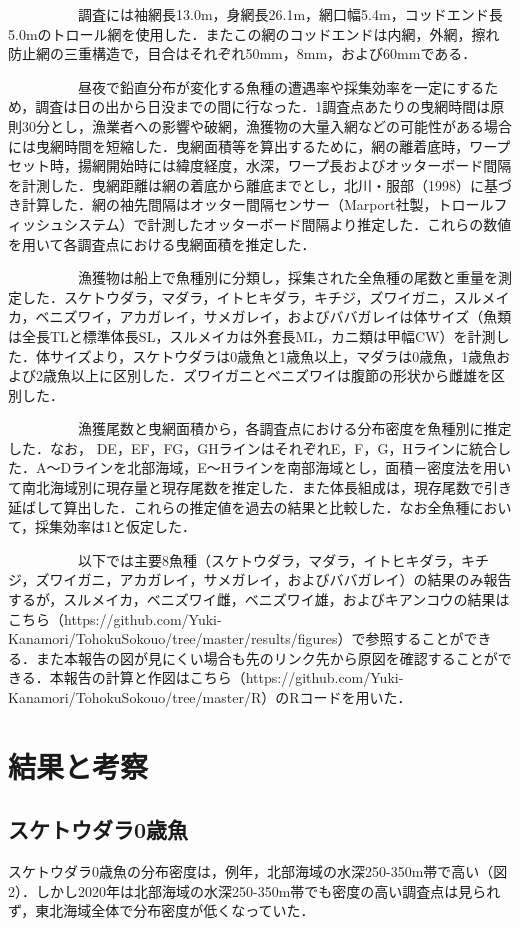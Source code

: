 \documentclass[11pt]{article} %
\begin{document}
\begin{linenumbers}
\ \ \ \ \ \ \ \ \ \ 
調査には袖網長13.0m，身網長26.1m，網口幅5.4m，コッドエンド長5.0mのトロール網を使用した．またこの網のコッドエンドは内網，外網，擦れ防止網の三重構造で，目合はそれぞれ50mm，8mm，および60mmである．

\ \ \ \ \ \ \ \ \ \ 
昼夜で鉛直分布が変化する魚種の遭遇率や採集効率を一定にするため，調査は日の出から日没までの間に行なった．1調査点あたりの曳網時間は原則30分とし，漁業者への影響や破網，漁獲物の大量入網などの可能性がある場合には曳網時間を短縮した．曳網面積等を算出するために，網の離着底時，ワープセット時，揚網開始時には緯度経度，水深，ワープ長およびオッターボード間隔を計測した．曳網距離は網の着底から離底までとし，北川・服部（1998）に基づき計算した．網の袖先間隔はオッター間隔センサー（Marport社製，トロールフィッシュシステム）で計測したオッターボード間隔より推定した．これらの数値を用いて各調査点における曳網面積を推定した．

\ \ \ \ \ \ \ \ \ \ 
漁獲物は船上で魚種別に分類し，採集された全魚種の尾数と重量を測定した．スケトウダラ，マダラ，イトヒキダラ，キチジ，ズワイガニ，スルメイカ，ベニズワイ，アカガレイ，サメガレイ，およびババガレイは体サイズ（魚類は全長TLと標準体長SL，スルメイカは外套長ML，カニ類は甲幅CW）を計測した．体サイズより，スケトウダラは0歳魚と1歳魚以上，マダラは0歳魚，1歳魚および2歳魚以上に区別した．ズワイガニとベニズワイは腹節の形状から雌雄を区別した．

\ \ \ \ \ \ \ \ \ \ 
漁獲尾数と曳網面積から，各調査点における分布密度を魚種別に推定した．なお， DE，EF，FG，GHラインはそれぞれE，F，G，Hラインに統合した．A～Dラインを北部海域，E～Hラインを南部海域とし，面積－密度法を用いて南北海域別に現存量と現存尾数を推定した．また体長組成は，現存尾数で引き延ばして算出した．これらの推定値を過去の結果と比較した．なお全魚種において，採集効率は1と仮定した．

\ \ \ \ \ \ \ \ \ \ 
以下では主要8魚種（スケトウダラ，マダラ，イトヒキダラ，キチジ，ズワイガニ，アカガレイ，サメガレイ，およびババガレイ）の結果のみ報告するが，スルメイカ，ベニズワイ雌，ベニズワイ雄，およびキアンコウの結果はこちら（https://github.com/Yuki-Kanamori/TohokuSokouo/tree/master/results/figures）で参照することができる．また本報告の図が見にくい場合も先のリンク先から原図を確認することができる．本報告の計算と作図はこちら（https://github.com/Yuki-Kanamori/TohokuSokouo/tree/master/R）のRコードを用いた．

\section{結果と考察}
\subsection{スケトウダラ0歳魚}
スケトウダラ0歳魚の分布密度は，例年，北部海域の水深250-350m帯で高い（図2）．しかし2020年は北部海域の水深250-350m帯でも密度の高い調査点は見られず，東北海域全体で分布密度が低くなっていた．


\end{linenumbers}
\end{document}
